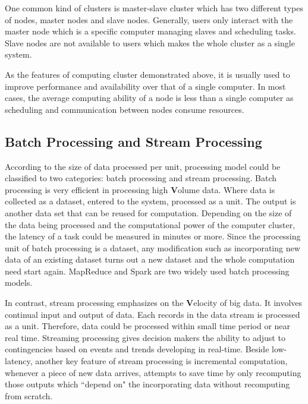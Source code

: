 One common kind of clusters is master-slave cluster which has two different types of nodes, master nodes and slave nodes. Generally, users only interact with the master node which is a specific computer managing slaves and scheduling tasks. Slave nodes are not available to users which makes the whole cluster as a single system.

As the features of computing cluster demonstrated above, it is usually used to improve performance and availability over that of a single computer. In most cases, the average computing ability of a node is less than a single computer as scheduling and communication between nodes consume resources.

\subsection{Batch Processing and Stream Processing}
According to the size of data processed per unit, processing model could be classified to two categories: batch processing and stream processing. Batch processing is very efficient in processing high \textbf{V}olume data. Where data is collected as a dataset, entered to the system, processed as a unit.  The output is another data set that can be reused for computation. Depending on the size of the data being processed and the computational power of the computer cluster, the latency of a task could be measured in minutes or more. Since the processing unit of batch processing is a dataset, any modification such as incorporating new data of an existing dataset turns out a new dataset and the whole computation need start again. MapReduce and Spark are two widely used batch processing models.
 
In contrast, stream processing emphasizes on the \textbf{V}elocity of big data. It involves continual input and output of data. Each records in the data stream is processed as a unit. Therefore, data could be processed within small time period or near real time. Streaming processing gives decision makers the ability to adjust to contingencies based on events and trends developing in real-time. Beside low-latency, another key feature of stream processing is incremental computation, whenever a piece of new data arrives, attempts to save time by only recomputing those outputs which ``depend on" the incorporating data without recomputing from scratch.

